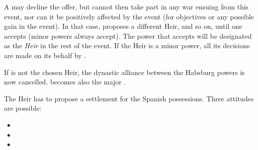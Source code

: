 \aparag A \MAJ may decline the offer, but cannot then take part in any war
ensuing from this event, nor can it be positively affected by the event (for
objectives or any possible gain in the event).
\bparag In that case, \SPA proposes a different Heir, and so on, until one
accepts (minor powers always accept).
\bparag The power that accepts will be designated as the \emph{Heir} in the
rest of the event.
\bparag If the Heir is a minor power, all its decisions are made on its behalf
by \SPA.

\aparag If \AUSaus is not the chosen Heir, the dynastic alliance between the
Habsburg powers is now cancelled.
\bparag \AUSMin becomes also the major \AUS.

\aparag The Heir has to propose a settlement for the Spanish
possessions. Three attitudes are possible:
\begin{itemize}
\item {}
\item {}
\item {}
\end{itemize}

